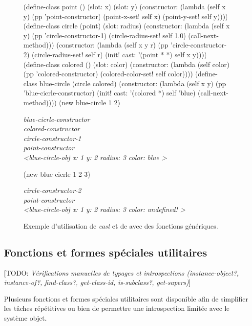 \documentclass[12pt,oneside,letterpaper,francais]{book}
\newcommand{\todo}[1]{[TODO: {\it #1}]}
\newcommand{\scheme}[1]{\selectlanguage{english}{\tt #1}\selectlanguage{french}}
\begin{document}
\begin{figure}[p!]
  \begin{schemecode}
(define-class point () (slot: x) (slot: y)
  (constructor: (lambda (self x y)
                  (pp 'point-constructor)
                  (point-x-set! self x) (point-y-set! self y))))
(define-class circle (point) (slot: radius)
  (constructor: (lambda (self x y)
                  (pp 'circle-constructor-1)
                  (circle-radius-set! self 1.0)
                  (call-next-method)))
  (constructor: (lambda (self x y r)
                  (pp 'circle-constructor-2)
                  (circle-radius-set! self r)
                  (init! cast: '(point * *) self x y))))
(define-class colored () (slot: color)
  (constructor: (lambda (self color)
                  (pp 'colored-constructor)
                  (colored-color-set! self color))))
(define-class blue-circle (circle colored)
  (constructor: (lambda (self x y)
                  (pp 'blue-cicrle-constructor)
                  (init! cast: '(colored *) self 'blue)
                  (call-next-method))))
(new blue-circle 1 2)
  \end{schemecode}
  {{\it
blue-cicrle-constructor\\
colored-constructor\\
circle-constructor-1\\
point-constructor\\
\textless blue-circle-obj x: 1 y: 2 radius: 3 color: blue \textgreater 
  }}
  \begin{schemecode}
    (new blue-cicrle 1 2 3)
  \end{schemecode}
  {{\it
circle-constructor-2\\
point-constructor\\
\textless blue-circle-obj x: 1 y: 2 radius: 3 color: undefined!  \textgreater
  }}
  \caption{Exemple d'utilisation de \textit{cast} et de
    \scheme{call-next-method} avec des fonctions génériques.}
  \label{OO:cast}
\end{figure}


\subsection{Fonctions et formes spéciales utilitaires}

\todo{Vérifications manuelles de typages et introspections
  (instance-object?, instance-of?, find-class?, get-class-id,
  is-subclass?, get-supers)}

Plusieurs fonctions et formes spéciales utilitaires sont disponible
afin de simplifier les tâches répétitives ou bien de permettre une
introspection limitée avec le système objet.
\end{document}
